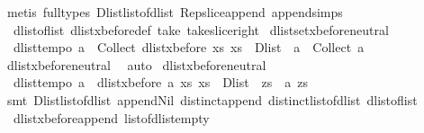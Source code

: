 \begin{isabellebody}
%
\isadelimproof
%
\endisadelimproof
%
\isatagproof
{}\isamarkupfalse%
\ {\isacharparenleft}metis\ {\isacharparenleft}full{\isacharunderscore}types{\isacharparenright}\ Dlist{\isacharunderscore}list{\isacharunderscore}of{\isacharunderscore}dlist\ Rep{\isacharunderscore}slice{\isacharunderscore}append\ append{\isachardot}simps{\isacharparenleft}{}{\isacharparenright}\ \isanewline
\ \ dlist{\isacharunderscore}of{\isacharunderscore}list\ dlist{\isacharunderscore}xbefore{\isacharunderscore}def\ take{\isacharunderscore}{}\ take{\isacharunderscore}slice{\isacharunderscore}right{\isacharparenright}%
\endisatagproof
{\isafoldproof}%
%
\isadelimproof
\isanewline
%
\endisadelimproof
\isanewline
{}\isamarkupfalse%
\ dlistset{\isacharunderscore}xbefore{\isacharunderscore}neutral{\isacharunderscore}{}{\isacharcolon}\ \isanewline
\ \ {\isachardoublequoteopen}dlist{\isacharunderscore}tempo{}\ a\ {\isasymLongrightarrow}\ Collect\ {\isacharparenleft}dlist{\isacharunderscore}xbefore\ {\isacharparenleft}{\isasymlambda}xs{\isachardot}\ xs\ {\isacharequal}\ Dlist\ {\isacharbrackleft}{\isacharbrackright}{\isacharparenright}\ a{\isacharparenright}\ {\isacharequal}\ Collect\ a{\isachardoublequoteclose}\isanewline
%
\isadelimproof
%
\endisadelimproof
%
\isatagproof
{}\isamarkupfalse%
\ dlist{\isacharunderscore}xbefore{\isacharunderscore}neutral{\isacharunderscore}{}\ \isamarkupfalse%
\ auto%
\endisatagproof
{\isafoldproof}%
%
\isadelimproof
\isanewline
%
\endisadelimproof
\isanewline
{}\isamarkupfalse%
\ dlist{\isacharunderscore}xbefore{\isacharunderscore}neutral{\isacharunderscore}{}{\isacharcolon}\ \isanewline
\ \ {\isachardoublequoteopen}dlist{\isacharunderscore}tempo{}\ a\ {\isasymLongrightarrow}\ dlist{\isacharunderscore}xbefore\ a\ {\isacharparenleft}{\isasymlambda}xs{\isachardot}\ xs\ {\isacharequal}\ Dlist\ {\isacharbrackleft}{\isacharbrackright}{\isacharparenright}\ zs\ {\isacharequal}\ a\ zs{\isachardoublequoteclose}\isanewline
%
\isadelimproof
%
\endisadelimproof
%
\isatagproof
{}\isamarkupfalse%
\ {\isacharparenleft}smt\ Dlist{\isacharunderscore}list{\isacharunderscore}of{\isacharunderscore}dlist\ append{\isacharunderscore}Nil{}\ distinct{\isacharunderscore}append\ distinct{\isacharunderscore}list{\isacharunderscore}of{\isacharunderscore}dlist\ dlist{\isacharunderscore}of{\isacharunderscore}list\ \isanewline
\ \ dlist{\isacharunderscore}xbefore{\isacharunderscore}append\ list{\isacharunderscore}of{\isacharunderscore}dlist{\isacharunderscore}empty{\isacharparenright}%

\end{isabellebody}
